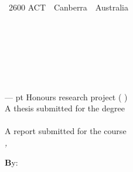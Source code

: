 
%
%


\thispagestyle{empty}



\ifStandardTitle %

\noindent
\begin{minipage}[t]{6cm}%
{\footnotesize%
 \\
~2600 ACT~\textbar~Canberra~\textbar~Australia}
\end{minipage}%
\hfill%
\begin{minipage}[b]{10cm}%
\hfill{}
\end{minipage}


\ \\[2em]
\phantom{x} \hfill
\begin{minipage}{58.75 mm}
\raggedright
\bfseries \School\\[.5em]
\mdseries%
\noindent\College
\end{minipage}\\[6 em]
\hfill

\noindent
\parbox{140mm}{\sffamily \bfseries \Huge %
\ProjectTitle%
}\\[.75 em]
{--- \ProjectPoints{} pt \ifHonoursThesis Honours \else research \fi project (\Semester{} \Year)}\\[3 em]


\ifHonoursThesis%
A thesis submitted for the degree\\
\emph{\Degree}\\[3 em]
\else%
A report submitted for the course\\
\emph{\CourseCode, \CourseName}\\[3 em]
\fi




\noindent
{\footnotesize \textbf By:}\\
\AuthorName\\[2em]




